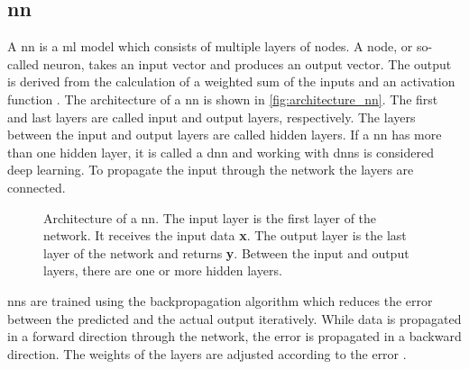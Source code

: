 \subsection{\acl*{nn}}\label{sec:neural_network}

A \ac{nn} is a \ac{ml} model which consists of multiple layers of nodes.
A node, or so-called neuron, takes an input vector and produces an output vector.
The output is derived from the calculation of a weighted sum of the inputs and an activation function \cite{KI2022}.
The architecture of a \ac{nn} is shown in \autoref{fig:architecture_nn}.
The first and last layers are called input and output layers, respectively.
The layers between the input and output layers are called hidden layers.
If a \ac{nn} has more than one hidden layer, it is called a \ac{dnn} and working with \acp{dnn} is considered deep learning.
To propagate the input through the network the layers are connected.

\begin{figure}[!htb] %
    \centering
    
    \caption[Architecture of a \ac{nn}]
    {Architecture of a \ac{nn}. 
    The input layer is the first layer of the network.
    It receives the input data \textbf{x}.
    The output layer is the last layer of the network and returns \textbf{y}.
    Between the input and output layers, there are one or more hidden layers.
    }
    \label{fig:architecture_nn}
\end{figure}

\acp{nn} are trained using the backpropagation algorithm which reduces the error between the predicted and the actual output iteratively.
While data is propagated in a forward direction through the network, the error is propagated in a backward direction.
The weights of the layers are adjusted according to the error \cite{KI2022}.
